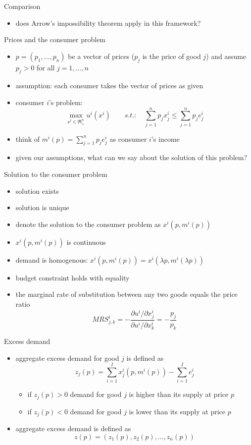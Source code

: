 \documentclass[bigger]{beamer}
\begin{document}
\begin{frame}[label={sec:org124977d}]{Comparison}
\begin{itemize}
\item does Arrow's impossibility theorem apply in this framework?
\end{itemize}
\end{frame}

\begin{frame}[label={sec:org2aab448}]{Prices and the consumer problem}
\begin{itemize}
\item \(p=(p_1,\dots,p_n)\) be a vector of prices (\(p_j\) is the price of good  \(j\)) and assume \(p_j>0\) for all \(j=1,\dots,n\)
\item assumption: each consumer takes the vector of prices as given
\item consumer \(i\)'s problem:
$$\max_{x^i\in\Re^n_+}u^i(x^i)\qquad s.t.:\quad \sum_{j=1}^np_jx_j^i\leq  \sum_{j=1}^np_je_j^i$$
\item think of \(m^i(p)=\sum_{j=1}^np_je_j^i\) as consumer \(i\)'s income
\item given our assumptions, what can we say about the solution of this problem?
\end{itemize}
\end{frame}
\begin{frame}[label={sec:org12be0b3}]{Solution to the consumer problem}
\begin{itemize}
\item solution exists
\item solution is unique
\item denote the solution to the consumer problem as \(x^i(p,m^i(p))\)
\item \(x^i(p,m^i(p))\) is continuous
\item demand is homogenous: \(x^i(p,m^i(p))=x^i(\lambda p,m^i(\lambda p))\)
\item budget constraint holds with equality
\item the marginal rate of substitution between any two goods equals the price ratio
$$MRS_{j,k}^i=-\frac{\partial u^i/\partial x^i_j}{\partial u^i/\partial x^i_k}= -\frac{p_j}{p_k}$$
\end{itemize}
\end{frame}

\begin{frame}[label={sec:org87d3ee0}]{Excess demand}
\begin{itemize}
\item aggregate excess demand for good \(j\) is defined as
$$z_j(p)=\sum_{i=1}^Ix_j^i(p,m^i(p))-\sum_{i=1}^Ie^i_j$$
\begin{itemize}
\item if \(z_j(p)>0\) demand for good \(j\) is higher than its supply at price \(p\)
\item if \(z_j(p)<0\) demand for good \(j\) is lower than its supply at price \(p\)
\end{itemize}
\item aggregate excess demand is defined as
$$z(p)=(z_1(p),z_2(p),\dots,z_n(p))$$
\end{itemize}
\end{frame}
\end{document}
